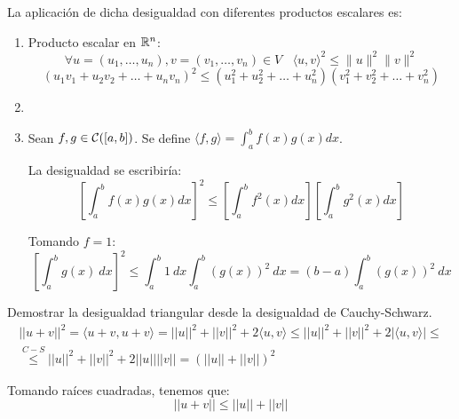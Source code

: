 \begin{ejemplo} La aplicación de dicha desigualdad con diferentes productos escalares es:
\begin{enumerate}
    \item Producto escalar en $\mathbb R^n$:
$$\forall u=(u_1, \ldots, u_n), v=(v_1, \ldots, v_n) \in V~~~~\langle u,v \rangle^2 \leq \|u\|^2\|v\|^2$$
$$(u_1v_1 + u_2v_2 + \ldots + u_nv_n)^2 \leq (u_1^2 + u_2^2 + \ldots + u_n^2)(v_1^2 + v_2^2 + \ldots + v_n^2)$$

    \item \item Sean $f,g\in \mathcal{C}([a,b])$. Se define $\langle f,g\rangle = \int_a^b f(x)g(x)dx$.

    La desigualdad se escribiría:
    \begin{equation*}
        \left[\int_a^b f(x)g(x)dx\right]^2 \leq \left[\int_a^b f^2(x)dx\right]\left[\int_a^b g^2(x)dx\right]
    \end{equation*}

Tomando $f=1$:
$$\left[ \int_a^b g(x)~dx \right]^2 \leq \int_a^b 1~dx \int_a^b (g(x))^2~dx = (b-a) \int_a^b (g(x))^2~dx$$
\end{enumerate}
    
\end{ejemplo}

\begin{ejercicio}
    Demostrar la desigualdad triangular desde la desigualdad de Cauchy-Schwarz.
    \begin{multline*}
        ||u+v||^2 = \langle u+v,u+v \rangle = ||u||^2 + ||v||^2 +2\langle u,v\rangle \leq ||u||^2 + ||v||^2 +2|\langle u,v\rangle| {\leq}\\ \stackrel{C-S}{\leq} ||u||^2 + ||v||^2 +2||u||||v|| = (||u|| + ||v||)^2
    \end{multline*}

    Tomando raíces cuadradas, tenemos que:
    \begin{equation*}
        ||u+v|| \leq ||u|| + ||v||
    \end{equation*}
\end{ejercicio}

